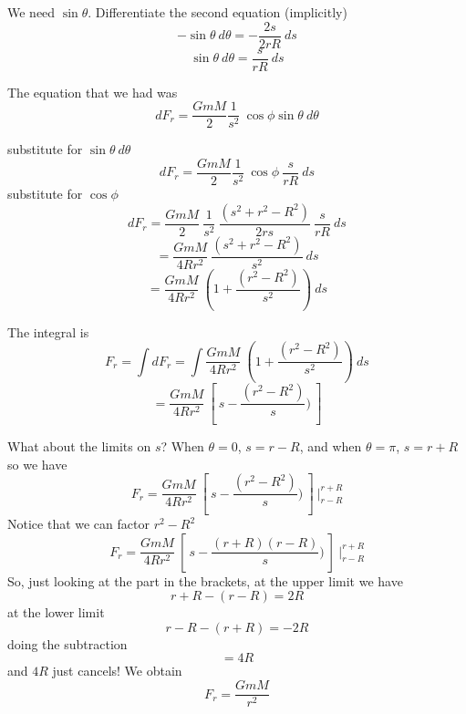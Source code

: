 \documentclass[11pt, oneside]{article}   	%
\begin{document}
We need $\sin \theta$.  Differentiate the second equation (implicitly)
\[ -\sin \theta \ d \theta = -\frac{2s}{2rR} \ ds  \]
\[ \sin \theta \ d \theta = \frac{s}{rR} \ ds \]

The equation that we had was
\[ dF_r = \frac{GmM}{2} \frac{1}{s^2} \ \cos \phi \sin \theta \ d \theta \]

substitute for $\sin \theta \ d \theta$
\[ dF_r = \frac{GmM}{2} \frac{1}{s^2} \ \cos \phi \ \frac{s}{rR} \ ds \]
substitute for $\cos \phi$
\[ dF_r = \frac{GmM}{2} \ \frac{1}{s^2} \ \frac{(s^2 + r^2 - R^2)}{2rs} \ \frac{s}{rR} \ ds \]
\[ =  \frac{GmM}{4R r^2} \ \frac{(s^2 + r^2 - R^2)}{s^2} \ ds \]
\[ =  \frac{GmM}{4R r^2} \ (1 + \frac{(r^2 - R^2)}{s^2}) \ ds \]

The integral is
\[ F_r = \int dF_r = \int \frac{GmM}{4R r^2} \ (1 + \frac{(r^2 - R^2)}{s^2}) \ ds \]
\[ =  \frac{GmM}{4R r^2} \ [ \ s -  \frac{(r^2 - R^2)}{s}) \ ]  \]

What about the limits on $s$?  When $\theta = 0$, $s = r - R$, and when $\theta = \pi$, $s = r + R$ so we have
\[ F_r = \frac{GmM}{4R r^2} \ [ \ s -  \frac{(r^2 - R^2)}{s}) \ ] \ \bigg |_{r - R}^{r +R} \]
Notice that we can factor $r^2 - R^2$
\[ F_r = \frac{GmM}{4R r^2} \ [ \ s -  \frac{(r+R)(r-R)}{s}) \ ] \ \bigg |_{r - R}^{r +R} \]
So, just looking at the part in the brackets, at the upper limit we have
\[ r + R - (r - R) = 2R \]
at the lower limit
\[ r - R - (r + R) = -2R \]
doing the subtraction 
\[ = 4R \]
and $4R$ just cancels!  We obtain
\[ F_r = \frac{GmM}{r^2} \]
\end{document}
